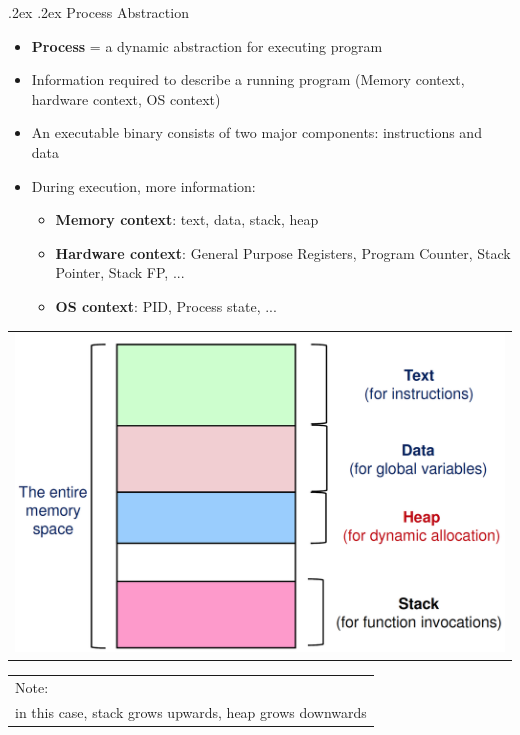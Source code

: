 \documentclass[10pt,landscape,a4paper]{article}
\makeatletter
\renewcommand{\subsection}{\@startsection{subsection}{1}{0mm}%
  {.2ex}%
  {.2ex}%
{\sffamily\bfseries}}
\makeatother
\begin{document}
\begin{multicols*}{4}
  \subsection{Process Abstraction}
  \begin{itemize}
    \item \textbf{Process} = a dynamic abstraction for executing program
    \item Information required to describe a running program (Memory context, hardware context, OS context)
    \item An executable binary consists of two major components: instructions and data
    \item During execution, more information:
    \begin{itemize}
      \item \textbf{Memory context}: text, data, stack, heap
      \item \textbf{Hardware context}: General Purpose Registers, Program Counter, Stack Pointer, Stack FP, ...
      \item \textbf{OS context}: PID, Process state, ...
    \end{itemize}
  \end{itemize}
  \begin{tabularx}{0.72\columnwidth}{X}
    \includegraphics[width=\linewidth]{stack-memory}
  \end{tabularx}
  \begin{tabularx}{0.25\columnwidth}{X}
    Note:\\ in this case, stack grows upwards, heap grows downwards
  \end{tabularx}
  

\end{multicols*}
\end{document}
